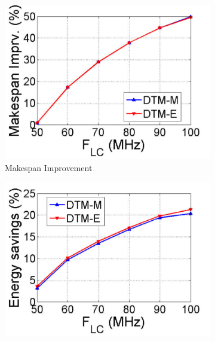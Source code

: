 

\begin{figure}[!tp]
	\centering
	\begin{subfigure}{.5\columnwidth}
		\centering
		\includegraphics[width=\columnwidth]{./figures/flow_makespan}
		\caption{Makespan Improvement}
		\label{fig:flow_makespan}
	\end{subfigure}
	\begin{subfigure}{.5\columnwidth}
		\centering
		\includegraphics[width=\columnwidth]{./figures/flow_energy}

\end{subfigure}
\end{figure}
